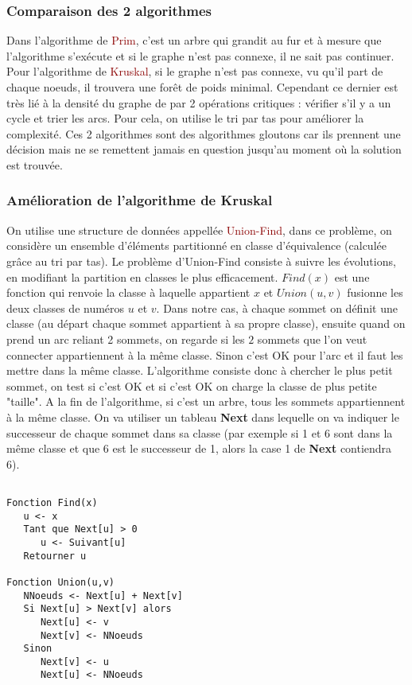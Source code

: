 \documentclass{article}
\newcommand{\red}[1]{\textcolor{darkred}{#1}}
\begin{document}
\subsubsection{Comparaison des 2 algorithmes}

Dans l'algorithme de \red{Prim}, c'est un arbre qui grandit au fur et à mesure que l'algorithme s'exécute et si le graphe n'est pas connexe, il ne sait pas continuer. Pour 
l'algorithme de \red{Kruskal}, si le graphe n'est pas connexe, vu qu'il part de chaque noeuds, il trouvera une forêt de poids minimal. Cependant ce dernier est très lié à la densité du 
graphe de par 2 opérations critiques : vérifier s'il y a un cycle et trier les arcs. Pour cela, on utilise le tri par tas pour améliorer la complexité. Ces 2 algorithmes sont des 
algorithmes gloutons car ils prennent une décision mais ne se remettent jamais en question jusqu'au moment où la solution est trouvée.

\subsubsection{Amélioration de l'algorithme de Kruskal}

On utilise une structure de données appellée \red{Union-Find}, dans ce problème, on considère un ensemble d'éléments partitionné en classe d'équivalence (calculée grâce au tri par 
tas). Le problème d'Union-Find consiste à suivre les évolutions, en modifiant la partition en classes le plus efficacement. $Find(x)$ est une fonction qui renvoie la classe à laquelle 
appartient $x$ et $Union(u,v)$ fusionne les deux classes de numéros $u$ et $v$. Dans notre cas, à chaque sommet on définit une classe (au départ chaque sommet appartient à sa 
propre classe), ensuite quand on prend un arc reliant 2 sommets, on regarde si les $2$ sommets que l'on veut connecter appartiennent à la même classe. Sinon c'est OK pour l'arc 
et il faut les mettre dans la même classe. L'algorithme consiste donc à chercher le plus petit sommet, on test si c'est OK et si c'est OK on charge la classe de plus petite "taille". A 
la fin de l'algorithme, si c'est un arbre, tous les sommets appartiennent à la même classe. On va utiliser un tableau \textbf{Next} dans lequelle on va indiquer le successeur de 
chaque sommet dans sa classe (par exemple si 1 et 6 sont dans la même classe et que 6 est le successeur de 1, alors la case 1 de \textbf{Next} contiendra 6).
\begin{verbatim}

Fonction Find(x)
   u <- x
   Tant que Next[u] > 0
      u <- Suivant[u]
   Retourner u

Fonction Union(u,v)
   NNoeuds <- Next[u] + Next[v] 
   Si Next[u] > Next[v] alors
      Next[u] <- v
      Next[v] <- NNoeuds
   Sinon 
      Next[v] <- u
      Next[u] <- NNoeuds
\end{verbatim}
\end{document}
